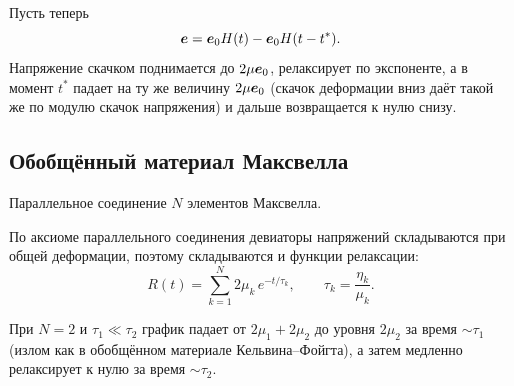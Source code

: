 Пусть теперь
\[
  \boldsymbol{e} = \boldsymbol{e}_0 H(t) - \boldsymbol{e}_0 H(t - t^*) .
\]
Напряжение скачком поднимается до $2\mu\boldsymbol{e}_0$, релаксирует по экспоненте, а в
момент $t^*$ падает на ту же величину $2\mu\boldsymbol{e}_0$ (скачок деформации вниз даёт
такой же по модулю скачок напряжения) и дальше возвращается к нулю снизу.


\subsection{Обобщённый материал Максвелла}

Параллельное соединение $N$ элементов Максвелла.


По аксиоме параллельного соединения девиаторы напряжений складываются при общей
деформации, поэтому складываются и функции релаксации:
\[
  R(t) = \sum_{k=1}^{N} 2\mu_k\, e^{-t/\tau_k} ,
  \qquad
  \tau_k = \frac{\eta_k}{\mu_k} .
\]

При $N = 2$ и $\tau_1 \ll \tau_2$ график падает от $2\mu_1 + 2\mu_2$ до уровня
$2\mu_2$ за время $\sim\tau_1$ (излом как в обобщённом материале
Кельвина–Фойгта), а затем медленно релаксирует к нулю за время $\sim\tau_2$.
